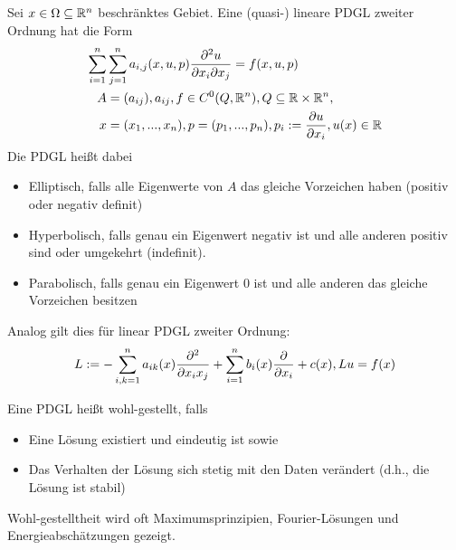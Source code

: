 \begin{definition}
	Sei $x \in \Omega \subseteq \mathbb{R}^n$ beschränktes Gebiet. Eine (quasi-) lineare PDGL zweiter Ordnung hat die Form
	\begin{align*}
		\sum_{i = 1}^n &\sum_{j=1}^{n} a_{i,j}(x,u,p) \frac{\partial ^2 u}{\partial x_i \partial x_j} = f(x, u, p) \\
		A &= (a_{ij}), a_{ij}, f \in C^{0}(Q,\mathbb{R}^n), Q \subseteq \mathbb{R} \times \mathbb{R}^n, \\
		x &= (x_1,...,x_n), p = (p_1,...,p_n), p_i := \frac{\partial u}{\partial x_i}, u(x) \in \mathbb{R}
	\end{align*}
	Die PDGL heißt dabei
	\begin{itemize}[noitemsep]
		\item Elliptisch, falls alle Eigenwerte von $A$ das gleiche Vorzeichen haben (positiv oder negativ definit)
		\item Hyperbolisch, falls genau ein Eigenwert negativ ist und alle anderen positiv sind oder umgekehrt (indefinit).
		\item Parabolisch, falls genau ein Eigenwert $0$ ist und alle anderen das gleiche Vorzeichen besitzen
	\end{itemize}
	Analog gilt dies für linear PDGL zweiter Ordnung:
	\begin{align*}
		L := -\sum_{i,k=1}^{n} a_{ik}(x) \frac{\partial ^2}{\partial x_i x_j} + \sum_{i = 1}^n b_i(x) \frac{\partial }{\partial x_i} + c(x), Lu = f(x)
	\end{align*}
\end{definition}

\begin{definition}
	Eine PDGL heißt wohl-gestellt, falls
	\begin{itemize}[noitemsep]
		\item Eine Lösung existiert und eindeutig ist sowie
		\item Das Verhalten der Lösung sich stetig mit den Daten verändert (d.h., die Lösung ist stabil)
	\end{itemize}
	Wohl-gestelltheit wird oft Maximumsprinzipien, Fourier-Lösungen und Energieabschätzungen gezeigt.
\end{definition}

